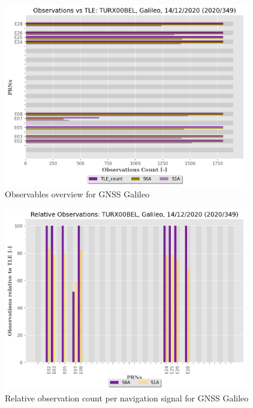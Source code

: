 \begin{figure}[H]%
\centering%
\includegraphics[width=0.95\textwidth]{png/TURX00BEL_R_20203491400_30M_01S_MO_E-ObsTLE.png}%
\caption{\label{fig:obst_gnss_E} Observables overview for GNSS Galileo}%
\end{figure}

%


\begin{figure}[H]%
\centering%
\includegraphics[width=0.95\textwidth]{png/TURX00BEL_R_20203491400_30M_01S_MO_E-PERC.png}%
\caption{\label{fig:prec_obst_gnss_E} Relative observation count per navigation signal for GNSS Galileo}%
\end{figure}

%
\clearpage

